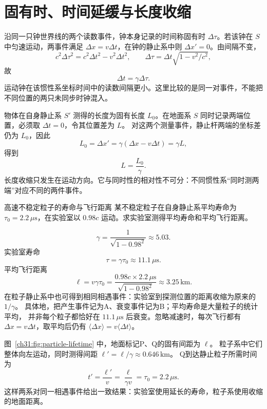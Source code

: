 \section{固有时、时间延缓与长度收缩}

沿同一只钟世界线的两个读数事件，钟本身记录的时间称固有时 $\Delta\tau$。若该钟在 $S$ 中匀速运动，两事件满足
$\Delta x=v\Delta t$，在钟的静止系中则 $\Delta x'=0$。由间隔不变，
\[
 c^2\Delta\tau^2=c^2\Delta t^2-v^2\Delta t^2,
 \qquad \Delta\tau=\Delta t\sqrt{1-v^2/c^2},
\]
故
\begin{equation}
 \Delta t=\gamma\Delta\tau.
\end{equation}
运动钟在该惯性系坐标时间中的读数间隔更小。这里比较的是同一对事件，不能把不同位置的两只未同步时钟混入。

物体在自身静止系 $S'$ 测得的长度为固有长度 $L_0$。在地面系 $S$ 同时记录两端位置，必须取 $\Delta t=0$，令其位置差为 $L$。
对这两个测量事件，静止杆两端的坐标差仍为 $L_0$，因此
\[
 L_0=\Delta x'=\gamma(\Delta x-v\Delta t)=\gamma L,
\]
得到
\begin{equation}
 L=\frac{L_0}{\gamma}.
\end{equation}
长度收缩只发生在运动方向。它与同时性的相对性不可分：不同惯性系“同时测两端”对应不同的两件事件。

\begin{origexamplebox}{高速不稳定粒子的寿命与飞行距离}
某不稳定粒子在自身静止系平均寿命为 $\tau_0=2.2\,\mu\mathrm s$，在实验室以 $0.98c$ 运动。求实验室测得平均寿命和平均飞行距离。
\end{origexamplebox}
\begin{xesolution}
\[
 \gamma=\frac1{\sqrt{1-0.98^2}}\approx5.03.
\]
实验室寿命
\[
 \boxed{\tau=\gamma\tau_0\approx11.1\,\mu\mathrm s}.
\]
平均飞行距离
\[
 \boxed{\ell=v\gamma\tau_0
 =\frac{0.98c\times2.2\,\mu\mathrm s}{\sqrt{1-0.98^2}}
 \approx3.25\,\mathrm{km}}.
\]
在粒子静止系中也可得到相同相遇事件：实验室到探测位置的距离收缩为原来的 $1/\gamma$。
具体地，把产生事件记为A、衰变事件记为B；平均寿命是大量粒子的统计平均，
并非每个粒子都恰好在 $11.1\,\mu\mathrm s$ 后衰变。忽略减速时，每次飞行都有
$\Delta x=v\Delta t$，取平均后仍有 $\langle\Delta x\rangle=v\langle\Delta t\rangle$。
\begin{center}

\label{ch31:fig:particle-lifetime}
\end{center}
图~\ref{ch31:fig:particle-lifetime} 中，地面标记P、Q的固有间距为 $\ell$。
粒子系中它们整体向左运动，同时测得间距
$\ell'=\ell/\gamma\approx0.646\,\mathrm{km}$。
Q到达静止粒子所需时间为
\[
 t'=\frac{\ell'}v=\frac{\ell}{\gamma v}=\tau_0=2.2\,\mu\mathrm s.
\]
这样两系对同一相遇事件给出一致结果：实验室使用延长的寿命，粒子系使用收缩的地面距离。
\end{xesolution}


